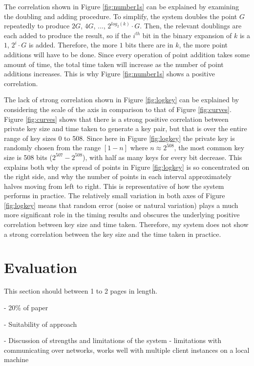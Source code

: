 \documentclass[12pt,a4paper]{article}
\begin{document}
The correlation shown in Figure \ref{fig:number1s} can be explained by examining the doubling and adding procedure. 
To simplify, the system doubles the point $G$ repeatedly to produce $2G$, $4G$, ..., $2^{log_2(k)} \cdot G$. 
Then, the relevant doublings are each added to produce the result, 
so if the $i^{th}$ bit in the binary expansion of $k$ is a $1$, $2^i \cdot G$ is added. 
Therefore, the more $1$ bits there are in $k$, the more point additions will have to be done. 
Since every operation of point addition takes some amount of time, the total time taken will increase as the number of point additions increases. 
This is why Figure \ref{fig:number1s} shows a positive correlation. 

The lack of strong correlation shown in Figure \ref{fig:logkey} can be explained by considering the scale of the axis in comparison to that of 
Figure \ref{fig:curves}. 
Figure \ref{fig:curves} shows that there is a strong positive correlation between private key size and time taken to generate a key pair, 
but that is over the entire range of key sizes 0 to 508. 
Since here in Figure \ref{fig:logkey} the private key is randomly chosen from the range $[1-n]$ where $n \approx 2^{508}$, 
the most common key size is 508 bits ($2^{507}-2^{508}$), with half as many keys for every bit decrease. 
This explains both why the spread of points in Figure \ref{fig:logkey} is so concentrated on the right side, 
and why the number of points in each interval approximately halves moving from left to right. 
This is representative of how the system performs in practice. 
The relatively small variation in both axes of Figure \ref{fig:logkey} means that random error (noise or natural variation) 
plays a much more significant role in the timing results and obscures the underlying positive correlation between key size and time taken. 
Therefore, my system does not show a strong correlation between the key size and the time taken in practice. 


\section{Evaluation} \noindent
This section should between 1 to 2 pages in length.

- 20\% of paper

- Suitability of approach

- Discussion of strengths and limitations of the system - limitations with communicating over networks, works well with multiple client instances on a local machine
\end{document}

